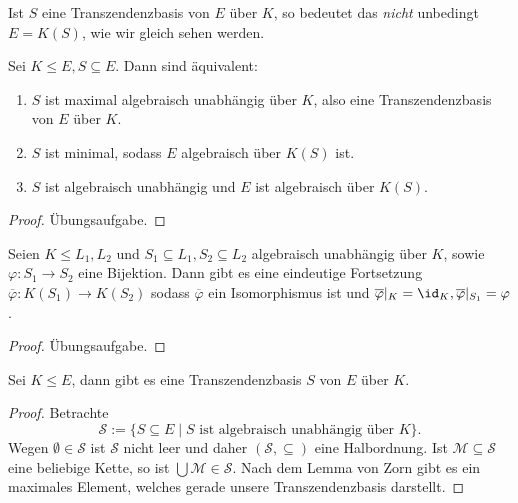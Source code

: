 \begin{remark}
    Ist $S$ eine Transzendenzbasis von $E$ über $K$, so bedeutet das \emph{nicht} unbedingt $E = K(S)$, wie wir gleich sehen werden.
\end{remark}

\begin{proposition}
    Sei $K \leq E, S \subseteq E$. Dann sind äquivalent:
    \begin{enumerate}
        \item $S$ ist maximal algebraisch unabhängig über $K$, also eine Transzendenzbasis von $E$ über $K$.
        \item $S$ ist minimal, sodass $E$ algebraisch über $K(S)$ ist.
        \item $S$ ist algebraisch unabhängig und $E$ ist algebraisch über $K(S)$.
    \end{enumerate}
\end{proposition}

\begin{proof}
    Übungsaufgabe.
\end{proof}

\begin{proposition}
    Seien $K \leq L_1, L_2$ und $S_1 \subseteq L_1, S_2 \subseteq L_2$ algebraisch unabhängig über $K$, sowie $\varphi : S_1 \to S_2$ eine Bijektion. Dann gibt es eine eindeutige Fortsetzung $\overline{\varphi} : K(S_1) \to K(S_2)$ sodass $\overline{\varphi}$ ein Isomorphismus ist und $\overline{\varphi} \vert_K = \id_K, \overline{\varphi} \vert_{S_1} = \varphi$.
\end{proposition}

\begin{proof}
    Übungsaufgabe.
\end{proof}

\begin{proposition}
    Sei $K \leq E$, dann gibt es eine Transzendenzbasis $S$ von $E$ über $K$.
\end{proposition}

\begin{proof}
    Betrachte
    $$ \mathcal{S} := \{ S \subseteq E \mid S \text{ ist algebraisch unabhängig über } K \}. $$
    Wegen $\emptyset\in\mathcal{S}$ ist $\mathcal{S}$ nicht leer und daher $(\mathcal{S}, \subseteq)$ eine Halbordnung. Ist $\mathcal{M} \subseteq \mathcal{S}$ eine beliebige Kette, so ist $\bigcup \mathcal{M} \in \mathcal{S}$. Nach dem Lemma von Zorn gibt es ein maximales Element, welches gerade unsere Transzendenzbasis darstellt.
\end{proof}

